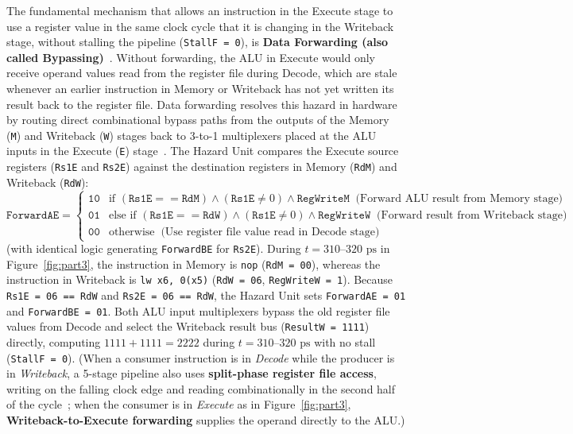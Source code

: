 \documentclass[11pt,a4paper]{article}
\begin{document}
The fundamental mechanism that allows an instruction in the Execute stage to use a register value in the same clock cycle that it is changing in the Writeback stage, without stalling the pipeline (\texttt{StallF = 0}), is \textbf{Data Forwarding (also called Bypassing)}~\cite{harris2021,patterson2020}. Without forwarding, the ALU in Execute would only receive operand values read from the register file during Decode, which are stale whenever an earlier instruction in Memory or Writeback has not yet written its result back to the register file. Data forwarding resolves this hazard in hardware by routing direct combinational bypass paths from the outputs of the Memory (\texttt{M}) and Writeback (\texttt{W}) stages back to 3-to-1 multiplexers placed at the ALU inputs in the Execute (\texttt{E}) stage~\cite{harris2021}. The Hazard Unit compares the Execute source registers (\texttt{Rs1E} and \texttt{Rs2E}) against the destination registers in Memory (\texttt{RdM}) and Writeback (\texttt{RdW}):
{\small
\begin{equation*}
\texttt{ForwardAE} = \begin{cases}
\texttt{10} & \text{if } (\texttt{Rs1E} == \texttt{RdM}) \land (\texttt{Rs1E} \neq 0) \land \texttt{RegWriteM} \;\; \text{(Forward ALU result from Memory stage)} \\
\texttt{01} & \text{else if } (\texttt{Rs1E} == \texttt{RdW}) \land (\texttt{Rs1E} \neq 0) \land \texttt{RegWriteW} \;\; \text{(Forward result from Writeback stage)} \\
\texttt{00} & \text{otherwise} \;\; \text{(Use register file value read in Decode stage)}
\end{cases}
\end{equation*}
}
(with identical logic generating \texttt{ForwardBE} for \texttt{Rs2E}). During $t = 310\text{--}320\text{ ps}$ in Figure~\ref{fig:part3}, the instruction in Memory is \texttt{nop} (\texttt{RdM = 00}), whereas the instruction in Writeback is \texttt{lw x6, 0(x5)} (\texttt{RdW = 06}, \texttt{RegWriteW = 1}). Because \texttt{Rs1E = 06 == RdW} and \texttt{Rs2E = 06 == RdW}, the Hazard Unit sets \texttt{ForwardAE = 01} and \texttt{ForwardBE = 01}. Both ALU input multiplexers bypass the old register file values from Decode and select the Writeback result bus (\texttt{ResultW = 1111}) directly, computing $1111 + 1111 = 2222$ during $t = 310\text{--}320\text{ ps}$ with no stall (\texttt{StallF = 0}). (When a consumer instruction is in \textit{Decode} while the producer is in \textit{Writeback}, a 5-stage pipeline also uses \textbf{split-phase register file access}, writing on the falling clock edge and reading combinationally in the second half of the cycle~\cite{harris2021,patterson2020}; when the consumer is in \textit{Execute} as in Figure~\ref{fig:part3}, \textbf{Writeback-to-Execute forwarding} supplies the operand directly to the ALU.)
\end{document}
